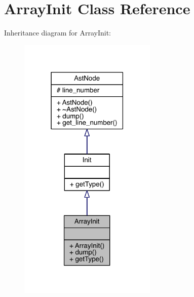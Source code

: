 \hypertarget{class_array_init}{}\section{Array\+Init Class Reference}
\label{class_array_init}


Inheritance diagram for Array\+Init\+:\nopagebreak
\begin{figure}[H]
\begin{center}
\leavevmode
\includegraphics[width=186pt]{class_array_init__inherit__graph}
\end{center}
\end{figure}


